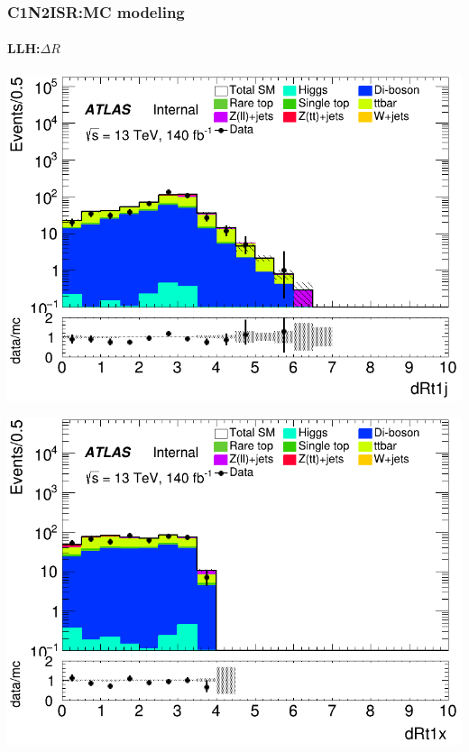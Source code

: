 \documentclass[usenames,dvipsnames]{beamer}
\begin{document}
\begin{frame}
\frametitle{C1N2ISR:MC modeling}
\framesubtitle{LLH:\quad $\Delta R$}
    \begin{minipage}{0.32\textwidth}
        \centering
        \includegraphics[width=\textwidth]{graphics/LLH_met/LLH_met_dRt1j.png}
    \end{minipage}
    \hfill
    \begin{minipage}{0.32\textwidth}
        \centering
        \includegraphics[width=\textwidth]{graphics/LLH_met/LLH_met_dRt1x.png}
    \end{minipage}
    \hfill
    \begin{minipage}{0.32\textwidth}
        \centering

\end{minipage}
\end{frame}
\end{document}
